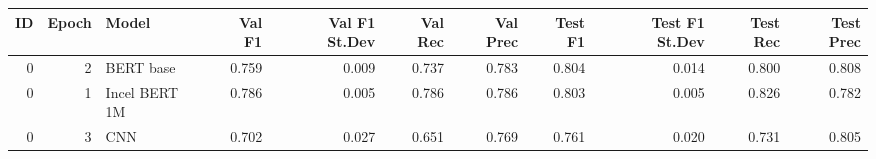 \begin{tabular}{rrlrrrrrrrr}
\toprule
 ID &  Epoch &         Model &  Val F1 &  Val F1 St.Dev &  Val Rec &  Val Prec &  Test F1 &  Test F1 St.Dev &  Test Rec &  Test Prec \\
\midrule
  0 &      2 &     BERT base &   0.759 &          0.009 &    0.737 &     0.783 &    0.804 &           0.014 &     0.800 &      0.808 \\
  0 &      1 & Incel BERT 1M &   0.786 &          0.005 &    0.786 &     0.786 &    0.803 &           0.005 &     0.826 &      0.782 \\
  0 &      3 &           CNN &   0.702 &          0.027 &    0.651 &     0.769 &    0.761 &           0.020 &     0.731 &      0.805 \\
\bottomrule
\end{tabular}
